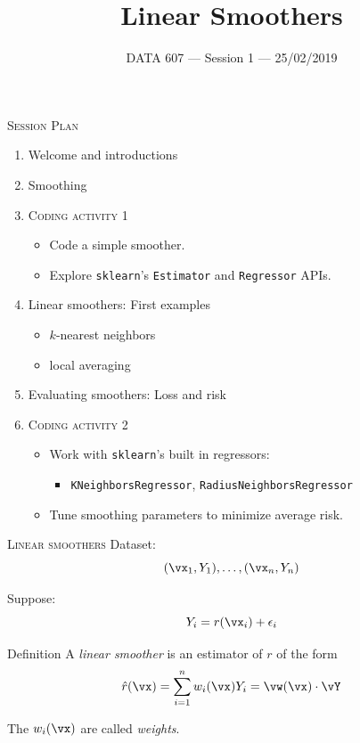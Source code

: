 \documentclass{beamer}
\begin{document}
    
\setlength{\parskip}{1em}
\begin{frame}
    \title{Linear Smoothers}
    \date{DATA 607 --- Session 1 --- 25/02/2019}
    \maketitle
\end{frame}


\begin{frame}{\textsc{Session Plan}}
    \begin{enumerate}
        \item Welcome and introductions
        \item Smoothing
        \item \textsc{Coding activity 1}
        \begin{itemize}
            \item Code a simple smoother.
            \item Explore \texttt{sklearn}'s \texttt{Estimator} and \texttt{Regressor} APIs.
        \end{itemize}
        \item Linear smoothers: First examples
        \begin{itemize}
            \item $k$-nearest neighbors
            \item local averaging
        \end{itemize}
        \item Evaluating smoothers: Loss and risk
        \item \textsc{Coding activity 2}
        \begin{itemize}
            \item Work with \texttt{sklearn}'s built in regressors:
            \begin{itemize}
                \item \texttt{KNeighborsRegressor}, \texttt{RadiusNeighborsRegressor}
            \end{itemize}
            \item Tune smoothing parameters to minimize average risk.
        \end{itemize}
    \end{enumerate}
\end{frame}
\begin{frame}{\textsc{Linear smoothers}}
    Dataset:
    \[
        (\vx_1, Y_1),\ldots,(\vx_n, Y_n)
    \]
    
    Suppose:
    \[
        Y_i = r(\vx_i) + \epsilon_i
    \]

    \begin{block}{Definition}
    A \emph{linear smoother} is an estimator of $r$ of the form
    \[
        \hat r(\vx) = \sum_{i=1}^n w_i(\vx)Y_i = \vw(\vx)\cdot \vY
    \]
    \end{block}

    The $w_i(\vx)$ are called \emph{weights}.
\end{frame}
\end{document}
